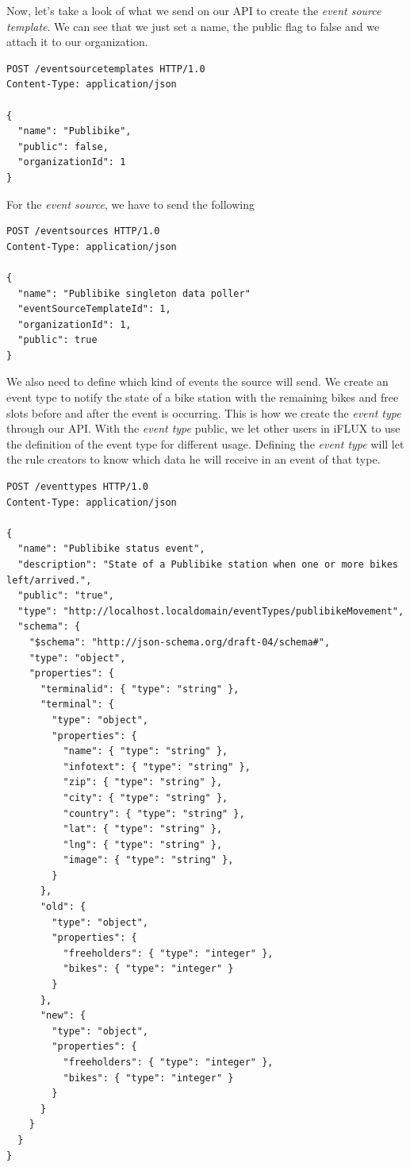 Now, let's take a look of what we send on our API to create the \emph{event source template}. We can see that we just set a name, the public flag to false and we attach it to our organization.

\begin{lstlisting}
POST /eventsourcetemplates HTTP/1.0
Content-Type: application/json

{
  "name": "Publibike",
  "public": false,
  "organizationId": 1
}
\end{lstlisting}

For the \emph{event source}, we have to send the following

\begin{lstlisting}
POST /eventsources HTTP/1.0
Content-Type: application/json

{
  "name": "Publibike singleton data poller"
  "eventSourceTemplateId": 1,
  "organizationId": 1,
  "public": true
}
\end{lstlisting}

We also need to define which kind of events the source will send. We create an event type to notify the state of a bike station with the remaining bikes and free slots before and after the event is occurring. This is how we create the \emph{event type} through our API. With the \emph{event type} public, we let other users in iFLUX to use the definition of the event type for different usage. Defining the \emph{event type} will let the rule creators to know which data he will receive in an event of that type.

\begin{lstlisting}
POST /eventtypes HTTP/1.0
Content-Type: application/json

{
  "name": "Publibike status event",
  "description": "State of a Publibike station when one or more bikes left/arrived.",
  "public": "true",
  "type": "http://localhost.localdomain/eventTypes/publibikeMovement",
  "schema": {
    "$schema": "http://json-schema.org/draft-04/schema#",
    "type": "object",
    "properties": {
      "terminalid": { "type": "string" },
      "terminal": {
        "type": "object",
        "properties": {
          "name": { "type": "string" },
          "infotext": { "type": "string" },
          "zip": { "type": "string" },
          "city": { "type": "string" },
          "country": { "type": "string" },
          "lat": { "type": "string" },
          "lng": { "type": "string" },
          "image": { "type": "string" },
        }
      },
      "old": {
        "type": "object",
        "properties": {
          "freeholders": { "type": "integer" },
          "bikes": { "type": "integer" }
        }
      },
      "new": {
        "type": "object",
        "properties": {
          "freeholders": { "type": "integer" },
          "bikes": { "type": "integer" }
        }
      }
    }
  }
}
\end{lstlisting}

